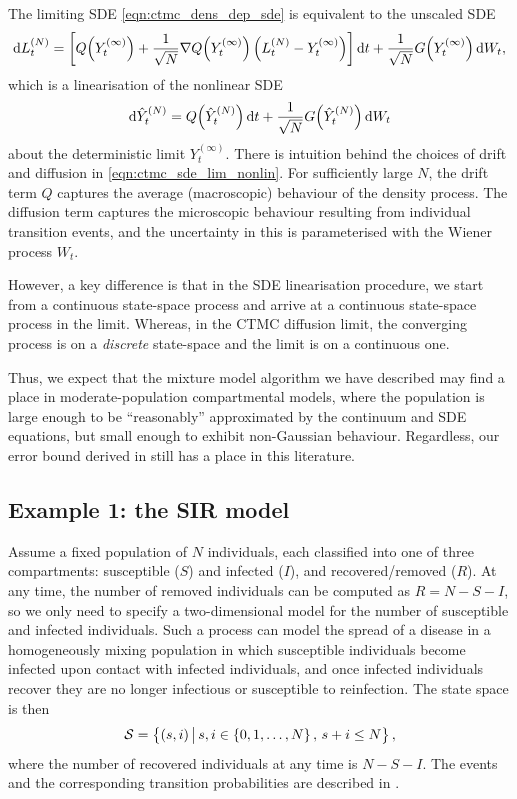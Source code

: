 The limiting SDE \cref{eqn:ctmc_dens_dep_sde} is equivalent to the unscaled SDE
\begin{equation}
	\dif L_t^{(N)} = \left[Q\!\left(Y_t^{(\infty)}\right) + \frac{1}{\sqrt{N}} \nabla Q\!\left(Y_t^{(\infty)}\right)\left(L_t^{(N)} - Y_t^{(\infty)}\right)\right]\dif t + \frac{1}{\sqrt{N}}G\!\left(Y_t^{(\infty)}\right)\dif W_t,
	\label{eqn:ctmc_sde_lin_lim}
\end{equation}
which is a linearisation of the nonlinear SDE
\begin{equation}
	\dif \hat{Y}^{(N)}_t = Q\!\left(\hat{Y}^{(N)}_t\right)\dif t + \frac{1}{\sqrt{N}}G\!\left(\hat{Y}_t^{(N)}\right)\dif W_t
	\label{eqn:ctmc_sde_lim_nonlin}
\end{equation}
about the deterministic limit \(Y_t^{(\infty)}\).
There is intuition behind the choices of drift and diffusion in \cref{eqn:ctmc_sde_lim_nonlin}.
For sufficiently large \(N\), the drift term \(Q\) captures the average (macroscopic) behaviour of the density process.
The diffusion term captures the microscopic behaviour resulting from individual transition events, and the uncertainty in this is parameterised with the Wiener process \(W_t\).




However, a key difference is that in the SDE linearisation procedure, we start from a continuous state-space process and arrive at a continuous state-space process in the limit.
Whereas, in the CTMC diffusion limit, the converging process is on a \emph{discrete} state-space and the limit is on a continuous one.




Thus, we expect that the mixture model algorithm we have described may find a place in moderate-population compartmental models, where the population is large enough to be ``reasonably'' approximated by the continuum and SDE equations, but small enough to exhibit non-Gaussian behaviour.
Regardless, our error bound derived in  still has a place in this literature.



\subsection{Example 1: the SIR model}
Assume a fixed population of \(N\) individuals, each classified into one of three compartments: susceptible (\(S\)) and infected (\(I\)), and recovered/removed (\(R\)).
At any time, the number of removed individuals can be computed as \(R = N - S - I\), so we only need to specify a two-dimensional model for the number of susceptible and infected individuals.
Such a process can model the spread of a disease in a homogeneously mixing population in which susceptible individuals become infected upon contact with infected individuals, and once infected individuals recover they are no longer infectious or susceptible to reinfection.
The state space is then
\[
	\mathcal{S} = \left\{\left(s,i\right)\,\middle|\,s,i \in \set{0,1,\dotsc,N}, \, s + i \leq N\right\},
\]
where the number of recovered individuals at any time is \(N - S - I\).
The events and the corresponding transition probabilities are described in .

